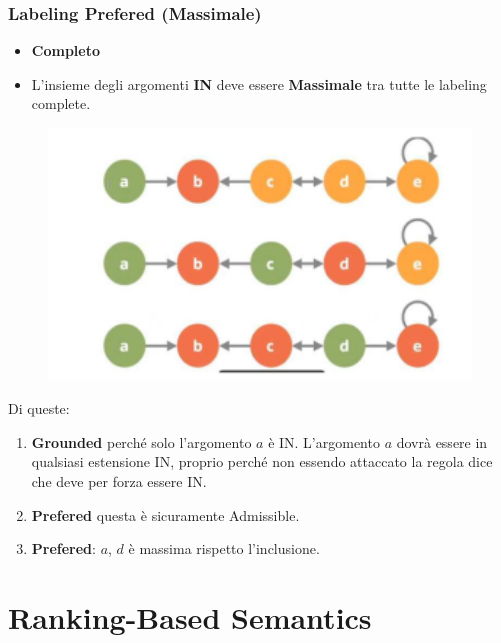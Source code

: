     \subsection{Labeling Prefered (Massimale)}
    \begin{itemize}
        \item \textbf{Completo}
        \item L'insieme degli argomenti \textbf{IN} deve essere
              \textbf{Massimale} tra tutte le labeling complete.
    \end{itemize}
    \begin{figure}[H]
        \centering
        \includegraphics[width=12cm, keepaspectratio]{img/Cap7/GR.png}
    \end{figure}
    Di queste:
    \begin{enumerate}
        \item \textbf{Grounded} perché solo l'argomento $a$ è IN. L'argomento
              $a$ dovrà essere in qualsiasi estensione IN, proprio perché non essendo
              attaccato la regola dice che deve per forza essere IN.
        \item \textbf{Prefered} questa è sicuramente Admissible.
        \item \textbf{Prefered}: $a$, $d$ è massima rispetto l'inclusione.
    \end{enumerate}


    \chapter{Ranking-Based Semantics} \label{Ranking-Based Semantics}
